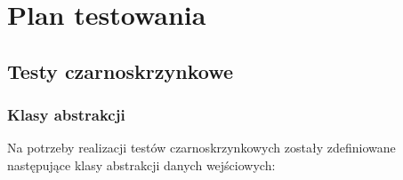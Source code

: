 \documentclass[10pt]{dokument-tiwo}
\begin{document}
\MakeDokumentMeta


\section{Plan testowania}
\subsection{Testy czarnoskrzynkowe}
\subsubsection{Klasy abstrakcji}
Na potrzeby realizacji testów czarnoskrzynkowych zostały zdefiniowane następujące klasy abstrakcji danych wejściowych:
\end{document}
